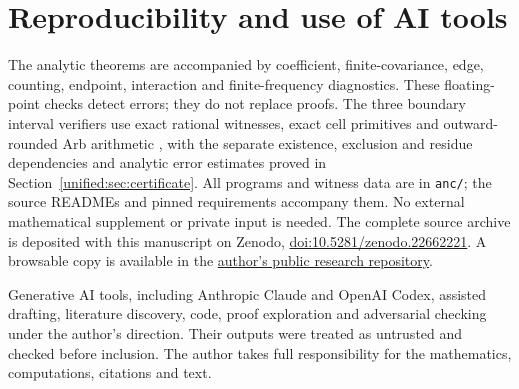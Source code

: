 \section*{Reproducibility and use of AI tools}
The analytic theorems are accompanied by coefficient, finite-covariance,
edge, counting, endpoint, interaction and finite-frequency diagnostics.
These floating-point checks detect errors; they do not replace proofs.
The three boundary interval verifiers use exact rational witnesses,
exact cell primitives and outward-rounded Arb arithmetic
\cite{Johansson2017}, with the separate existence, exclusion and residue
dependencies and analytic error estimates proved in Section~\ref{unified:sec:certificate}.
All programs and witness data are in \texttt{anc/}; the source READMEs
and pinned requirements accompany them. No external mathematical
supplement or private input is needed.
The complete source archive is deposited with this manuscript on
Zenodo, \href{https://doi.org/10.5281/zenodo.22662221}{doi:10.5281/zenodo.22662221}.
A browsable copy is available in the
\href{https://github.com/akivag613/connes-cvs-/tree/main/papers/4_sine_loewner_bulk_boundary}{author's public research repository}.

Generative AI tools, including Anthropic Claude and OpenAI Codex,
assisted drafting, literature discovery, code, proof exploration and
adversarial checking under the author's direction. Their outputs were
treated as untrusted and checked before inclusion. The author takes
full responsibility for the mathematics, computations, citations and text.
